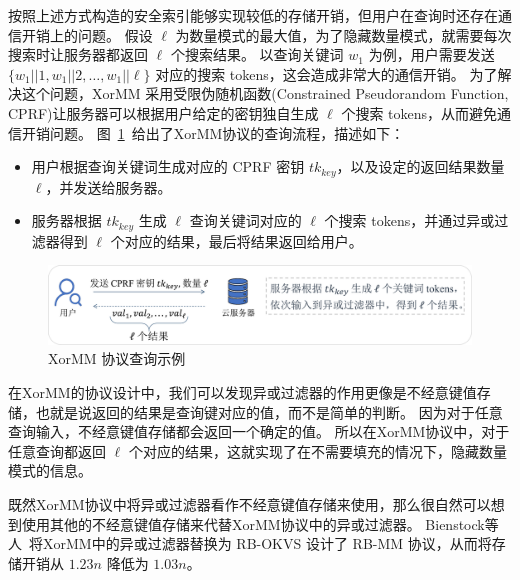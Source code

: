 按照上述方式构造的安全索引能够实现较低的存储开销，但用户在查询时还存在通信开销上的问题。
假设 $\ell$ 为数量模式的最大值，为了隐藏数量模式，就需要每次搜索时让服务器都返回 $\ell$ 个搜索结果。
以查询关键词 $w_1$ 为例，用户需要发送 $\{w_1 || 1, w_1 ||2, \dots, w_1 || \ell \}$ 对应的搜索 tokens，这会造成非常大的通信开销。
为了解决这个问题，XorMM 采用受限伪随机函数(Constrained Pseudorandom Function, CPRF)让服务器可以根据用户给定的密钥独自生成 $\ell$ 个搜索 tokens，从而避免通信开销问题。
图~\ref{fig:xormm_example}~给出了XorMM协议的查询流程，描述如下：
\begin{itemize}
  \item 用户根据查询关键词生成对应的 CPRF 密钥 $tk_{key}$，以及设定的返回结果数量 $\ell$，并发送给服务器。
  \item 服务器根据 $tk_{key}$ 生成 $\ell$ 查询关键词对应的 $\ell$ 个搜索 tokens，并通过异或过滤器得到 $\ell$ 个对应的结果，最后将结果返回给用户。
\end{itemize}
\begin{figure}[ht]
  \centering
  \includegraphics[width=\textwidth]{figures/xormm_exp.pdf}
  \caption{XorMM 协议查询示例}
  \label{fig:xormm_example}
\end{figure}

在XorMM的协议设计中，我们可以发现异或过滤器的作用更像是不经意键值存储，也就是说返回的结果是查询键对应的值，而不是简单的判断。
因为对于任意查询输入，不经意键值存储都会返回一个确定的值。
所以在XorMM协议中，对于任意查询都返回 $\ell$ 个对应的结果，这就实现了在不需要填充的情况下，隐藏数量模式的信息。

既然XorMM协议中将异或过滤器看作不经意键值存储来使用，那么很自然可以想到使用其他的不经意键值存储来代替XorMM协议中的异或过滤器。
Bienstock等人~\cite{bienstock2023NearOptimal}将XorMM中的异或过滤器替换为 RB-OKVS 设计了 RB-MM 协议，从而将存储开销从 $1.23n$ 降低为 $1.03n$。

